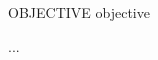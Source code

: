 \documentclass{resume} %
\begin{document}

\begin{rSection}{OBJECTIVE}
{{objective}}
\end{rSection}
...
\end{document}
